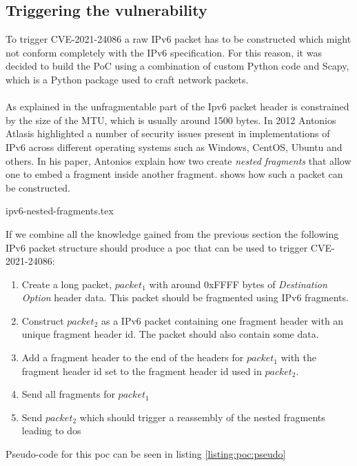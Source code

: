\documentclass{report}
\begin{document}
\subsection{Triggering the vulnerability}
To trigger CVE-2021-24086 a raw IPv6 packet has to be constructed which might not conform completely with the IPv6 specification. For this reason, it was decided to build the PoC using a combination of custom Python code and Scapy\cite{url:ipv6:scapy}, which is a Python package used to craft network packets.
\\
\\
As explained in  the unfragmentable part of the Ipv6 packet header is constrained by the size of the MTU, which is usually around 1500 bytes. In 2012 Antonios Atlasis highlighted a number of security issues present in implementations of IPv6 across different operating systems such as Windows, CentOS, Ubuntu and others\cite{url:ipv6:abusing-ipv6}. In his paper, Antonios explain how two create \emph{nested fragments} that allow one to embed a fragment inside another fragment.  shows how such a packet can be constructed.

{ipv6-nested-fragments.tex}

If we combine all the knowledge gained from the previous section the following IPv6 packet structure should produce a \gls{poc} that can be used to trigger CVE-2021-24086:

\begin{enumerate}
    \item Create a long packet, $packet_1$ with around 0xFFFF bytes of \emph{Destination Option} header data. This packet should be fragmented using IPv6 fragments.
    \item Construct $packet_2$ as a IPv6 packet containing one fragment header with an unique fragment header id. The packet should also contain some data.
    \item Add a fragment header to the end of the headers for $packet_1$ with the fragment header id set to the fragment header id used in $packet_2$.
    \item Send all fragments for $packet_1$
    \item Send $packet_2$ which should trigger a reassembly of the nested fragments leading to \gls{dos}
\end{enumerate}

Pseudo-code for this \gls{poc} can be seen in listing \ref{listing:poc:pseudo}
\end{document}

